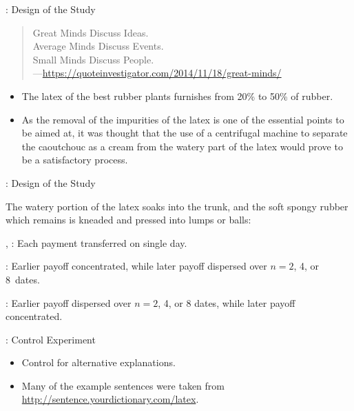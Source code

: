 \begin{frame}{\titleprefix: Design of the Study}

	\begin{quote}
		Great Minds Discuss Ideas. \\
		Average Minds Discuss Events. \\
		Small Minds Discuss People. \\
		\upshape ---\url{https://quoteinvestigator.com/2014/11/18/great-minds/}
	\end{quote}

	\begin{itemize}
		\item The latex of the best rubber plants furnishes from 20\% to 50\% of rubber.
		\item As the removal of the impurities of the latex is one of the essential points to be aimed at, it was thought that the use of a centrifugal machine to separate the caoutchouc as a cream from the watery part of the latex would prove to be a satisfactory process.
	\end{itemize}

\end{frame}


\begin{frame}{\titleprefix: Design of the Study}

	The watery portion of the latex soaks into the trunk, and the soft spongy rubber which remains is kneaded and pressed into lumps or balls:
	
	\alert{\balA, \balB:} Each payment transferred on single day.
	
	\alert{\unbalA:} Earlier payoff concentrated, while later payoff dispersed over ${n = 2}$, 4, or 8~dates.
	
	\alert{\unbalB:} Earlier payoff dispersed over ${n = 2}$, 4, or 8 dates, while later payoff concentrated.

\end{frame}


\begin{frame}{\titleprefix: Control Experiment}

	\begin{itemize}
		\item Control for alternative explanations.
		\item Many of the example sentences were taken from \url{http://sentence.yourdictionary.com/latex}.
	\end{itemize}

\end{frame}


